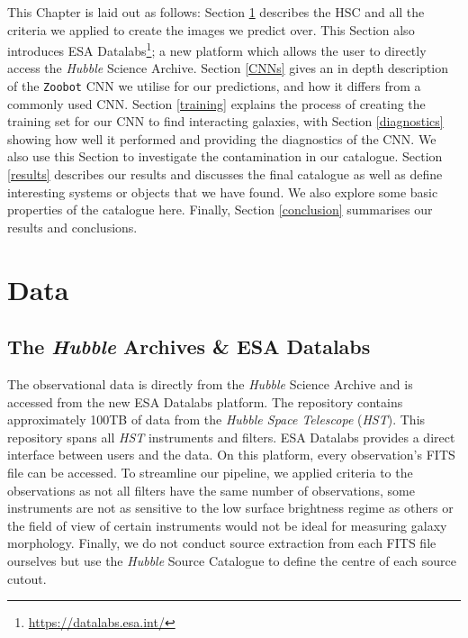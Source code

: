 This Chapter is laid out as follows: Section \ref{data} describes the HSC and all the criteria we applied to create the images we predict over. This Section also introduces ESA Datalabs\footnote{\url{https://datalabs.esa.int/}}; a new platform which allows the user to directly access the \emph{Hubble} Science Archive. Section \ref{CNNs} gives an in depth description of the \texttt{Zoobot} CNN we utilise for our predictions, and how it differs from a commonly used CNN. Section \ref{training} explains the process of creating the training set for our CNN to find interacting galaxies, with Section \ref{diagnostics} showing how well it performed and providing the diagnostics of the CNN. We also use this Section to investigate the contamination in our catalogue. Section \ref{results} describes our results and discusses the final catalogue as well as define interesting systems or objects that we have found. We also explore some basic properties of the catalogue here. Finally, Section \ref{conclusion} summarises our results and conclusions.



\section{Data}\label{data}
\subsection{The \emph{Hubble} Archives \& ESA Datalabs}
\noindent The observational data is directly from the \emph{Hubble} Science Archive and is accessed from the new ESA Datalabs platform. The repository contains approximately 100TB of data from the \emph{Hubble Space Telescope} (\emph{HST}). This repository spans all \emph{HST} instruments and filters. ESA Datalabs provides a direct interface between users and the data. On this platform, every observation's FITS file can be accessed. To streamline our pipeline, we applied criteria to the observations as not all filters have the same number of observations, some instruments are not as sensitive to the low surface brightness regime as others or the field of view of certain instruments would not be ideal for measuring galaxy morphology. Finally, we do not conduct source extraction from each FITS file ourselves but use the \emph{Hubble} Source Catalogue \citep[][hereafter HSC]{2016AJ....151..134W} to define the centre of each source cutout.

